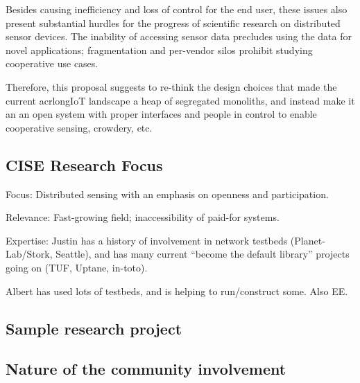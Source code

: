 Besides causing inefficiency and loss of control for the end user,
these issues also present substantial hurdles for the progress
of scientific research on distributed sensor devices.
The inability of accessing sensor data precludes using the
data for novel applications; fragmentation and per-vendor silos
prohibit studying cooperative use cases.

Therefore, this proposal suggests to re-think the design choices
that made the current acrlong{IoT} landscape a heap of segregated
monoliths, and instead make it an an open system with proper interfaces and people in control to enable cooperative sensing, crowdery, etc.


\subsection{CISE Research Focus}

Focus: Distributed sensing with an emphasis on openness and participation.

Relevance: Fast-growing field; inaccessibility of paid-for systems.

Expertise: Justin has a history of involvement in network testbeds
(Planet-Lab/Stork, Seattle), and has many current ``become the default
library'' projects going on (TUF, Uptane, in-toto).

Albert has used lots of testbeds, and is helping to run/construct some.
Also EE.


\subsection{Sample research project}

\subsection{Nature of the community involvement}


